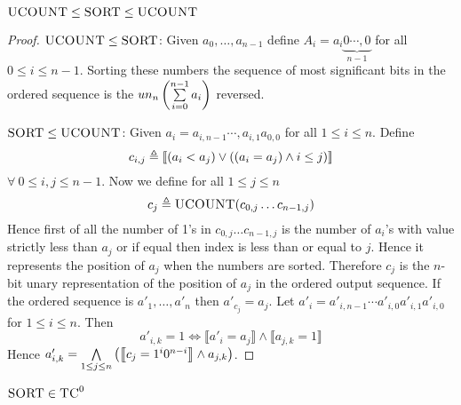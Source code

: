 \begin{theorem}
	$\textsc{UCOUNT}\leq \textsc{SORT}\leq \textsc{UCOUNT}$
\end{theorem}
\begin{proof} $\textsc{UCOUNT}\leq \textsc{SORT}$: 	Given $a_0,\dots, a_{n-1}$ define $A_i=a_i\underbrace{0\cdots,0}_{n-1}$ for all $0\leq i\leq n-1$. Sorting these numbers the sequence of most significant bits in the ordered sequence is the $un_n\left( \sum\limits_{i=0}^{n-1}a_i\right)$ reversed.

$\textsc{SORT}\leq \textsc{UCOUNT}$: Given $a_i=a_{i,n-1}\cdots, a_{i,1}a_{0,0}$ for all $1\leq i\leq n$.  Define $$c_{i,j}\triangleq\left\llbracket(a_i<a_j)\vee ((a_i=a_j)\wedge i\leq j)\right\rrbracket$$ $\forall\ 0\leq i,j\leq n-1$. Now we define for all $1\leq j\leq n$ $$c_j\triangleq \textsc{UCOUNT}(c_{0,j}\dots c_{n-1,j})$$Hence first of all the number of 1's in $c_{0,j}\dots c_{n-1,j}$ is the number of $a_i$'s with value strictly less than $a_j$ or if equal then index is less than or equal to $j$. Hence it represents the position of $a_j$ when the numbers are sorted. Therefore $c_j$ is the $n$-bit unary representation of the position of $a_j$ in the ordered output sequence. If the ordered sequence is $a'_{1}, \dots, a'_{n}$ then $a'_{c_j}=a_j$. Let $a'_i=a'_{i,n-1}\cdots a'_{i,0}a'_{i,1}a'_{i,0}$ for $1\leq i\leq n$. Then $$a'_{i,k}=1\iff \llbracket a'_{i}=a_j\rrbracket \wedge \llbracket a_{j,k}=1\rrbracket$$ Hence $a'_{i,k}=\bigwedge\limits_{1\leq j\leq n}\left(\left\llbracket c_j=1^i0^{n-i}\right\rrbracket \wedge a_{j,k}  \right)$.
\end{proof}

\begin{corollary}
	$\textsc{SORT}\in \textsc{TC}^0$
\end{corollary}


